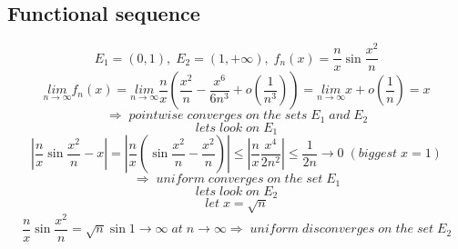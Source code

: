 \documentclass{article}
\begin{document}
\subsection{Functional sequence}
\begin{equation}
    E_1=(0,1), \; E_2=(1, +\infty), \; f_n (x) = \frac{n}{x} \sin \frac{x^2}{n}
\end{equation}
\begin{equation*}
    \underset{n \rightarrow \infty}{lim} f_n (x) = \underset{n \rightarrow \infty}{lim} \frac{n}{x}(\frac{x^2}{n}-\frac{x^6}{6n^3}+o(\frac{1}{n^3})) = \underset{n \rightarrow \infty}{lim} x + o(\frac{1}{n}) = x
\end{equation*}
\begin{equation*}
    \Rightarrow \; pointwise \; converges \; on \; the \; sets \; E_1 \; and \; E_2
\end{equation*}
\begin{equation*}
    lets \; look \; on \; E_1
\end{equation*}
\begin{equation*}
    |\frac{n}{x} \sin \frac{x^2}{n} - x| = |\frac{n}{x}(\sin \frac{x^2}{n}-\frac{x^2}{n})| \leq |\frac{n}{x}\frac{x^4}{2n^2}| \leq \frac{1}{2n} \rightarrow 0 \; (biggest \; x=1)
\end{equation*}
\begin{equation}
    \Rightarrow \; uniform \; converges \; on \; the \; set \; E_1
\end{equation}
\begin{equation*}
    lets \; look \; on \; E_2
\end{equation*}
\begin{equation*}
    let \; x = \sqrt{n}
\end{equation*}
\begin{equation}
    \frac{n}{x} \sin \frac{x^2}{n} = \sqrt{n} \sin 1 \rightarrow \infty \; at \; n \rightarrow \infty \Rightarrow \; uniform \; disconverges \; on \; the \; set \; E_2
\end{equation}

\newpage
\end{document}
